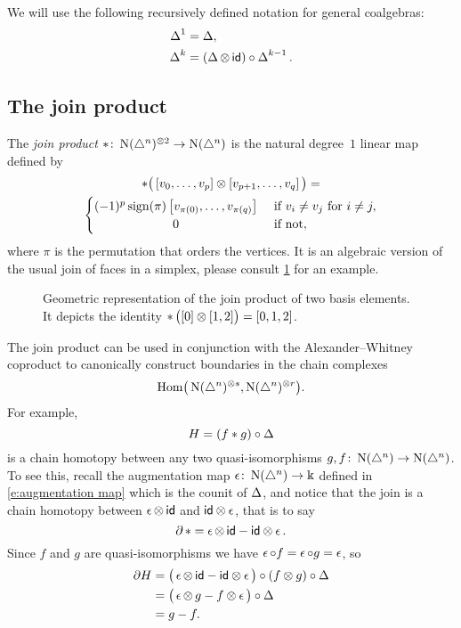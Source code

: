 We will use the following recursively defined notation for general coalgebras:
\begin{align*}
\operatorname{\Delta}^1 &= \operatorname{\Delta}, \\
\operatorname{\Delta}^k &= (\operatorname{\Delta} \otimes \, \mathsf{id}) \circ \operatorname{\Delta}^{k-1}.
\end{align*}

\subsection{The join product}

The \textit{join product} $\ast \colon \operatorname{N}(\triangle^n)^{\otimes 2} \to \operatorname{N}(\triangle^n)$ is the natural degree~$1$ linear map defined by
\begin{multline}
\ast \big(\left[v_0, \dots, v_p \right] \ot \left[v_{p+1}, \dots, v_q\right]\big) = \\
\begin{cases} (-1)^{p} \sign(\pi) \left[v_{\pi(0)}, \dots, v_{\pi(q)}\right] & \text{ if } v_i \neq v_j \text{ for } i \neq j, \\
\hfil 0 & \text{ if not}, \end{cases}
\end{multline}
where $\pi$ is the permutation that orders the vertices.
It is an algebraic version of the usual join of faces in a simplex, please consult \cref{f:join of faces} for an example.

\begin{figure}
	
	\caption{Geometric representation of the join product of two basis elements. It depicts the identity $\operatorname{\ast} \big( [0] \otimes [1,2] \big) = [0,1,2]$.}
	\label{f:join of faces}
\end{figure}

The join product can be used in conjunction with the Alexander--Whitney coproduct to canonically construct boundaries in the chain complexes
\[
\mathrm{Hom} \big( \operatorname{N}(\triangle^n)^{\otimes s}, \operatorname{N}(\triangle^n)^{\otimes r} \big).
\]
For example,
\[
H = (f \ast g) \circ \operatorname{\Delta}
\]
is a chain homotopy between any two quasi-isomorphisms $g, f \colon \operatorname{N}(\triangle^n) \to \operatorname{N}(\triangle^n)$.
To see this, recall the augmentation map $\operatorname{\epsilon} \colon \operatorname{N}(\triangle^n) \to \Bbbk$ defined in \eqref{e:augmentation map} which is the counit of $\operatorname{\Delta}$, and notice that the join is a chain homotopy between $\operatorname{\epsilon} \otimes \, \mathsf{id}$ and $\mathsf{id} \otimes \operatorname{\epsilon}$, that is to say
\begin{equation}
\partial \operatorname{\ast} = \operatorname{\epsilon} \otimes \, \mathsf{id} - \mathsf{id} \otimes \operatorname{\epsilon}.
\end{equation}
Since $f$ and $g$ are quasi-isomorphisms we have $\operatorname{\epsilon} \circ f = \operatorname{\epsilon} \circ g = \operatorname{\epsilon}$, so
\begin{align*}
\partial H &=
\big( \operatorname{\epsilon} \otimes \, \mathsf{id} - \mathsf{id} \otimes \operatorname{\epsilon} \big) \circ (f \otimes g) \circ \operatorname{\Delta} \\ &=
\big(\operatorname{\epsilon} \otimes \, g - f \otimes \operatorname{\epsilon} \big) \circ \operatorname{\Delta} \\ &= g - f.
\end{align*}

